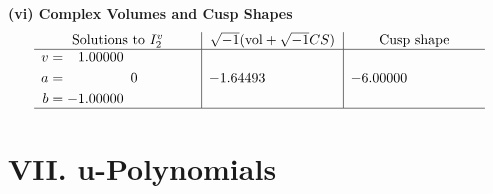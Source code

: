 \documentclass[1p]{elsarticle_modified}
\theoremstyle{definition}
\newcommand{\I}{\sqrt{-1}}
\begin{document}
\newpage\flushleft \textbf{(vi) Complex Volumes and Cusp Shapes}
$$\begin{array}{c|c|c}  
\text{Solutions to }I^v_{2}& \I (\text{vol} + \sqrt{-1}CS) & \text{Cusp shape}\\
 \hline 
\begin{aligned}
v &= \phantom{-}1.00000\phantom{ +0.000000I} \\
a &= \phantom{-0.000000 } 0 \\
b &= -1.00000\phantom{ +0.000000I}\end{aligned}
 & -1.64493\phantom{ +0.000000I} & -6.00000\phantom{ +0.000000I}\\
 \hline 
 \end{array}$$\newpage
\newpage\renewcommand{\arraystretch}{1}
\centering \section*{ VII. u-Polynomials}
\end{document}
